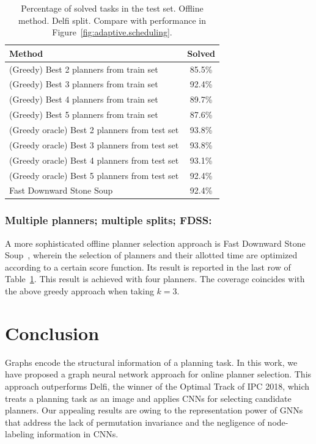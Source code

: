 \documentclass[letterpaper]{article} %
\begin{document}
\begin{table}[ht]
\centering
\caption{Percentage of solved tasks in the test set. Offline method. Delfi split. Compare with performance in Figure~\ref{fig:adaptive.scheduling}.}
\label{tab:offline.portfolio}
\begin{tabular}{lc}
\hline
Method & Solved \\
\hline
(Greedy) Best 2 planners from train set & 85.5\% \\
(Greedy) Best 3 planners from train set & 92.4\% \\
(Greedy) Best 4 planners from train set & 89.7\% \\
(Greedy) Best 5 planners from train set & 87.6\% \\
\hline
(Greedy oracle) Best 2 planners from test set & 93.8\% \\
(Greedy oracle) Best 3 planners from test set & 93.8\% \\
(Greedy oracle) Best 4 planners from test set & 93.1\% \\
(Greedy oracle) Best 5 planners from test set & 92.4\% \\
\hline
Fast Downward Stone Soup & 92.4\% \\
\hline
\end{tabular}
\end{table}


\subsubsection{Multiple planners; multiple splits; FDSS:} A more sophisticated offline planner selection approach is Fast Downward Stone Soup~\cite{helmert-et-al-ipc2011}, wherein the selection of planners and their allotted time are optimized according to a certain score function. Its result is reported in the last row of Table~\ref{tab:offline.portfolio}. This result is achieved with four planners. The coverage coincides with the above greedy approach when taking $k=3$.


\section{Conclusion}
Graphs encode the structural information of a planning task. In this work, we have proposed a graph neural network approach for online planner selection. This approach outperforms Delfi, the winner of the Optimal Track of IPC 2018, which treats a planning task as an image and applies CNNs for selecting candidate planners. Our appealing results are owing to the representation power of GNNs that address the lack of permutation invariance and the negligence of node-labeling information in CNNs. 
\end{document}

